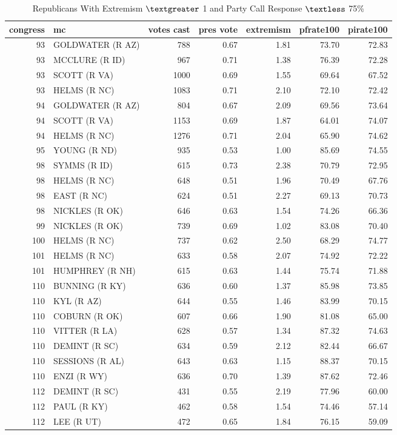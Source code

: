 \documentclass[12pt]{article}
\begin{document}
\begin{table}[ht]
	\centering
	\caption{Republicans With Extremism $ \textgreater $ 1 and Party Call Response $ \textless $ 75\%}
	\begin{tabular}{rlrrrrr}
		\hline
		congress & mc & votes cast & pres vote & extremism & pfrate100 & pirate100 \\
		\hline
		93 & GOLDWATER (R AZ) & 788 & 0.67 & 1.81 & 73.70 & 72.83 \\
		93 & MCCLURE (R ID) & 967 & 0.71 & 1.38 & 76.39 & 72.28 \\
		93 & SCOTT (R VA) & 1000 & 0.69 & 1.55 & 69.64 & 67.52 \\
		93 & HELMS (R NC) & 1083 & 0.71 & 2.10 & 72.10 & 72.42 \\
		94 & GOLDWATER (R AZ) & 804 & 0.67 & 2.09 & 69.56 & 73.64 \\
		94 & SCOTT (R VA) & 1153 & 0.69 & 1.87 & 64.01 & 74.07 \\
		94 & HELMS (R NC) & 1276 & 0.71 & 2.04 & 65.90 & 74.62 \\
		95 & YOUNG (R ND) & 935 & 0.53 & 1.00 & 85.69 & 74.55 \\
		98 & SYMMS (R ID) & 615 & 0.73 & 2.38 & 70.79 & 72.95 \\
		98 & HELMS (R NC) & 648 & 0.51 & 1.96 & 70.49 & 67.76 \\
		98 & EAST (R NC) & 624 & 0.51 & 2.27 & 69.13 & 70.73 \\
		98 & NICKLES (R OK) & 646 & 0.63 & 1.54 & 74.26 & 66.36 \\
		99 & NICKLES (R OK) & 739 & 0.69 & 1.02 & 83.08 & 70.40 \\
		100 & HELMS (R NC) & 737 & 0.62 & 2.50 & 68.29 & 74.77 \\
		101 & HELMS (R NC) & 633 & 0.58 & 2.07 & 74.92 & 72.22 \\
		101 & HUMPHREY (R NH) & 615 & 0.63 & 1.44 & 75.74 & 71.88 \\
		110 & BUNNING (R KY) & 636 & 0.60 & 1.37 & 85.98 & 73.85 \\
		110 & KYL (R AZ) & 644 & 0.55 & 1.46 & 83.99 & 70.15 \\
		110 & COBURN (R OK) & 607 & 0.66 & 1.90 & 81.08 & 65.00 \\
		110 & VITTER (R LA) & 628 & 0.57 & 1.34 & 87.32 & 74.63 \\
		110 & DEMINT (R SC) & 634 & 0.59 & 2.12 & 82.44 & 66.67 \\
		110 & SESSIONS (R AL) & 643 & 0.63 & 1.15 & 88.37 & 70.15 \\
		110 & ENZI (R WY) & 636 & 0.70 & 1.39 & 87.62 & 72.46 \\
		112 & DEMINT (R SC) & 431 & 0.55 & 2.19 & 77.96 & 60.00 \\
		112 & PAUL (R KY) & 462 & 0.58 & 1.54 & 74.46 & 57.14 \\
		112 & LEE (R UT) & 472 & 0.65 & 1.84 & 76.15 & 59.09 \\
		\hline
	\end{tabular}
\end{table}
\end{document}
